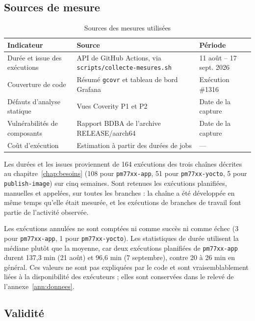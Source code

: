 \subsection{Sources de mesure}
\begin{table}[H]
\centering
\caption{Sources des mesures utilisées}
\label{tab:eval-sources}
\small
\begin{tabularx}{\textwidth}{@{}l X l@{}}
\toprule
\textbf{Indicateur} & \textbf{Source} & \textbf{Période} \\
\midrule
Durée et issue des exécutions & API de GitHub Actions, via
  \texttt{scripts/collecte-mesures.sh} &
  11 août -- 17 sept. 2026 \\
Couverture de code & Résumé \texttt{gcovr} et tableau de bord Grafana &
  Exécution \#1316 \\
Défauts d'analyse statique & Vues Coverity P1 et P2 &
  Date de la capture \\
Vulnérabilités de composants & Rapport BDBA de l'archive RELEASE/aarch64 &
  Date de la capture \\
Coût d'exécution & Estimation à partir des durées de jobs & --- \\
\bottomrule
\end{tabularx}
\end{table}

Les durées et les issues proviennent de 164 exécutions des trois chaînes
décrites au chapitre~\ref{chap:besoins} (108 pour \texttt{pm77xx-app}, 51 pour
\texttt{pm77xx-yocto}, 5 pour \texttt{publish-image}) sur cinq semaines. Sont
retenues les exécutions planifiées, manuelles et appelées, sur toutes les
branches : la chaîne a été développée en même temps qu'elle était mesurée, et
les exécutions de branches de travail font partie de l'activité observée.

Les exécutions annulées ne sont comptées ni comme succès ni comme échec (3 pour
\texttt{pm77xx-app}, 1 pour \texttt{pm77xx-yocto}). Les statistiques de durée
utilisent la médiane plutôt que la moyenne, car deux exécutions planifiées de
\texttt{pm77xx-app} durent 137,3 min (21 août) et 96,6 min (7 septembre), contre
20 à 26 min en général. Ces valeurs ne sont pas expliquées par le code et sont
vraisemblablement liées à la disponibilité des exécuteurs ; elles sont
conservées dans le relevé de l'annexe~\ref{ann:donnees}.

\subsection{Validité}

